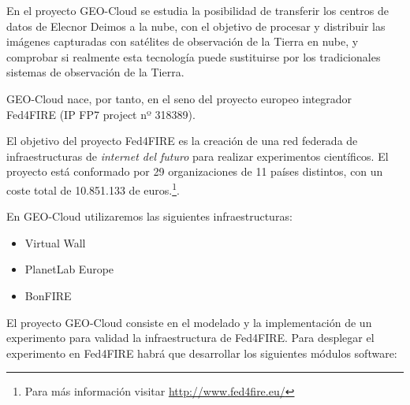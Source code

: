 En el proyecto GEO-Cloud se estudia la posibilidad de transferir los centros de datos de Elecnor Deimos a la nube, con el objetivo de procesar y distribuir las imágenes capturadas con satélites de observación de la Tierra en nube, y comprobar si realmente esta tecnología puede sustituirse por los tradicionales sistemas de observación de la Tierra.

GEO-Cloud nace, por tanto, en el seno del proyecto europeo integrador Fed4FIRE\cite{F4F} (IP FP7 project nº 318389).

El objetivo del proyecto Fed4FIRE es la creación de una red federada de infraestructuras de \emph{internet del futuro} para realizar experimentos científicos.  El proyecto está conformado por 29 organizaciones de 11 países distintos, con un coste total de 10.851.133 de euros.\footnote{Para más información visitar \url{http://www.fed4fire.eu/}}.

En GEO-Cloud  utilizaremos las siguientes infraestructuras:
\begin{itemize}
\item Virtual Wall\cite{VW}
\item PlanetLab Europe\cite{PLE}
\item BonFIRE\cite{BF}
\end{itemize}

El proyecto GEO-Cloud consiste en el modelado y la implementación de un experimento para validad la infraestructura de Fed4FIRE. Para desplegar el experimento en Fed4FIRE habrá que desarrollar los siguientes módulos software:

